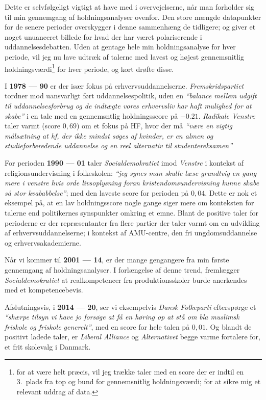 Dette er selvfølgeligt vigtigt at have med i overvejelserne, når man forholder sig til min gennemgang af holdningsanalyser ovenfor.
Den store mængde datapunkter for de senere perioder overskygger i denne sammenhæng de tidligere; og giver et noget unuanceret billede for hvad der har været polariserende i uddannelsesdebatten.
Uden at gentage hele min holdningsanalyse for hver periode, vil jeg nu lave udtræk af talerne med lavest og højest gennemsnitlig holdningsværdi\footnote{
for at være helt præcis, vil jeg trække taler med en score der er indtil en 3.\ plads fra top og bund for gennemsnitlig holdningsværdi; for at sikre mig et relevant uddrag af data.} 
for hver periode, og kort drøfte disse.

I \textbf{1978 --- 90} er der især fokus på erhvervsuddannelserne. \textit{Fremskridspartiet} tordner mod uansvarligt ført uddannelsespolitik, uden en \textit{“balance mellem udgift til uddannelsesforbrug og de indtægte vores erhvervsliv har haft mulighed for at skabe”} i en tale med en gennemsntlig holdningsscore på $-0.21$.
\textit{Radikale Venstre} taler varmt (score $0,69$) om et fokus på HF, hvor der må \textit{“være en vigtig målsætning at hf, der ikke mindst søges af kvinder, er en almen og studieforberedende uddannelse og en reel alternativ til studentereksamen”}

For perioden \textbf{1990 --- 01} taler \textit{Socialdemokratiet} imod \textit{Venstre} i kontekst af religionsundervisning i folkeskolen: \textit{“jeg synes man skulle læse grundtvig en gang mere i venstre hvis orde livsoplysning foran kristendomsundervisning kunne skabe så stor kvababbelse”}; med den laveste score for perioden på $0,04$.
Dette er nok et eksempel på, at en lav holdningsscore nogle gange siger mere om konteksten for talerne end politikernes synspunkter omkring et emne.
Blant de positive taler for perioderne er der repræsentanter fra flere partier der taler varmt om en udvikling af erhvervsuddannelserne; i kontekst af AMU-centre, den fri ungdomsuddannelse og erhvervsakademierne.

Når vi kommer til \textbf{2001 --- 14}, er der mange gengangere fra min første gennemgang af holdningsanalyser.
I forlængelse af denne trend, fremlægger \textit{Socialdemokratiet} at realkompetencer fra produktionsskoler burde anerkendes med et kompetencebevis.

Afslutningsvis, i \textbf{2014 --- 20}, ser vi eksempelvis \textit{Dansk Folkeparti} efterspørge et  \textit{“skærpe tilsyn vi have jo forsøge at få en høring op at stå om bla muslimsk friskole og friskole generelt”}, med en score for hele talen på $0,01$.
Og blandt de positivt ladede taler, er \textit{Liberal Alliance} og \textit{Alternativet} begge varme fortalere for, et frit skolevalg i Danmark.

